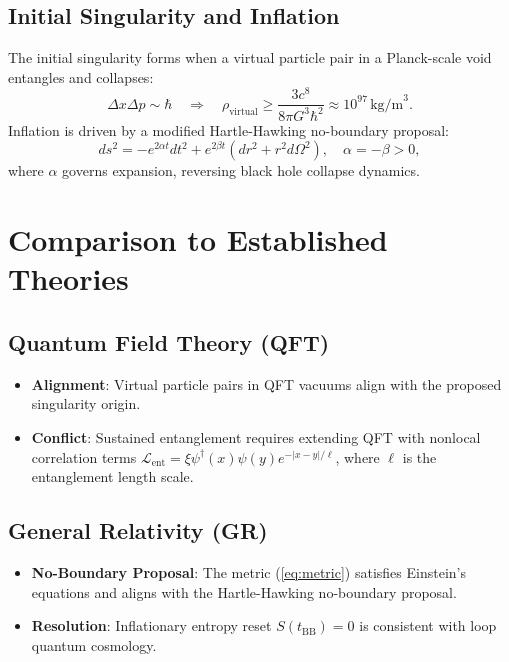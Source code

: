 \documentclass{article}
\begin{document}
\subsection{Initial Singularity and Inflation}
The initial singularity forms when a virtual particle pair in a Planck-scale void entangles and collapses:
\begin{equation}
\Delta x \Delta p \sim \hbar \quad \Rightarrow \quad \rho_{\text{virtual}} \geq \frac{3c^8}{8\pi G^3 \hbar^2} \approx 10^{97} \, \text{kg/m}^3. \label{eq:singularity}
\end{equation}
Inflation is driven by a modified Hartle-Hawking no-boundary proposal:
\begin{equation}
ds^2 = -e^{2\alpha t} dt^2 + e^{2\beta t} \left( dr^2 + r^2 d\Omega^2 \right), \quad \alpha = -\beta > 0, \label{eq:metric}
\end{equation}
where \( \alpha \) governs expansion, reversing black hole collapse dynamics.

\section{Comparison to Established Theories}
\subsection{Quantum Field Theory (QFT)}
\begin{itemize}
\item \textbf{Alignment}: Virtual particle pairs in QFT vacuums align with the proposed singularity origin.
\item \textbf{Conflict}: Sustained entanglement requires extending QFT with nonlocal correlation terms \( \mathscr{L}_{\text{ent}} = \xi \psi^\dagger(x) \psi(y) e^{-|x-y|/\ell} \), where \( \ell \) is the entanglement length scale.
\end{itemize}

\subsection{General Relativity (GR)}
\begin{itemize}
\item \textbf{No-Boundary Proposal}: The metric (\ref{eq:metric}) satisfies Einstein's equations and aligns with the Hartle-Hawking no-boundary proposal.
\item \textbf{Resolution}: Inflationary entropy reset \( S(t_{\text{BB}}) = 0 \) is consistent with loop quantum cosmology.
\end{itemize}
\end{document}
